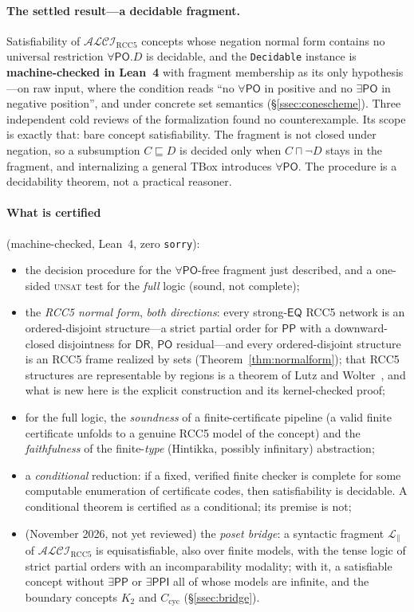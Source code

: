 \documentclass[11pt]{article}
\newcommand{\ALCIRCC}[1]{\mathcal{ALCI}_{\mathrm{RCC#1}}}
\newcommand{\DR}{\mathsf{DR}}
\newcommand{\PO}{\mathsf{PO}}
\newcommand{\PP}{\mathsf{PP}}
\newcommand{\PPI}{\mathsf{PPI}}
\newcommand{\EQ}{\mathsf{EQ}}
\newcommand{\code}[1]{\texttt{#1}}
\theoremstyle{plain}
\theoremstyle{definition}
\begin{document}
\paragraph{The settled result---a decidable fragment.} Satisfiability of
$\ALCIRCC{5}$ concepts whose negation normal form contains no universal
restriction $\forall\PO.D$ is decidable, and the \code{Decidable} instance is
\textbf{machine-checked in Lean~4} with fragment membership as its only
hypothesis---on raw input, where the condition reads ``no $\forall\PO$ in
positive and no $\exists\PO$ in negative position'', and under concrete set
semantics (\S\ref{ssec:conescheme}). Three independent cold reviews of the
formalization found no counterexample. Its scope is exactly that: bare
concept satisfiability. The fragment is not closed under negation, so a
subsumption $C\sqsubseteq D$ is decided only when $C\sqcap\neg D$ stays in
the fragment, and internalizing a general TBox introduces $\forall\PO$. The
procedure is a decidability theorem, not a practical reasoner.

\paragraph{What is certified} (machine-checked, Lean~4, zero
\code{sorry}):
\begin{itemize}
  \item the decision procedure for the $\forall\PO$-free fragment just
    described, and a one-sided \textsc{unsat} test for the \emph{full}
    logic (sound, not complete);
  \item the \emph{RCC5 normal form}, \emph{both directions}: every
    strong-$\EQ$ RCC5 network is an ordered-disjoint structure---a strict
    partial order for $\PP$ with a downward-closed disjointness for
    $\DR$, $\PO$ residual---and every ordered-disjoint structure is an
    RCC5 frame realized by sets (Theorem~\ref{thm:normalform}); that RCC5
    structures are representable by regions is a theorem of Lutz and
    Wolter~\cite[Thm.~23]{LutzWolter2006}, and what is new here is the
    explicit construction and its kernel-checked proof;
  \item for the full logic, the \emph{soundness} of a finite-certificate
    pipeline (a valid finite certificate unfolds to a genuine RCC5 model of
    the concept) and the \emph{faithfulness} of the finite-\emph{type}
    (Hintikka, possibly infinitary) abstraction;
  \item a \emph{conditional} reduction: if a fixed, verified finite checker
    is complete for some computable enumeration of certificate codes, then
    satisfiability is decidable. A conditional theorem is certified as a
    conditional; its premise is not;
  \item (November 2026, not yet reviewed) the \emph{poset bridge}: a
    syntactic fragment $\mathcal L_{\parallel}$ of $\ALCIRCC{5}$ is
    equisatisfiable, also over finite models, with the tense logic of strict
    partial orders with an incomparability modality; with it, a satisfiable
    concept without $\exists\PP$ or $\exists\PPI$ all of whose models are
    infinite, and the boundary concepts $K_2$ and $C_{\mathrm{cyc}}$
    (\S\ref{ssec:bridge}).
\end{itemize}
\end{document}
